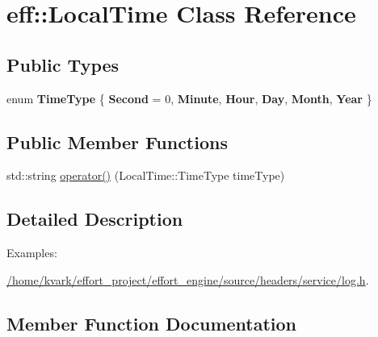 \hypertarget{classeff_1_1LocalTime}{}\section{eff\+:\+:Local\+Time Class Reference}
\label{classeff_1_1LocalTime}
\subsection*{Public Types}
\begin{DoxyCompactItemize}
\item 
\mbox{\label{classeff_1_1LocalTime_a09de312805bf8c27785ca4fab8c94767}} 
enum {\bfseries Time\+Type} \{ \newline
{\bfseries Second} = 0, 
{\bfseries Minute}, 
{\bfseries Hour}, 
{\bfseries Day}, 
\newline
{\bfseries Month}, 
{\bfseries Year}
 \}
\end{DoxyCompactItemize}
\subsection*{Public Member Functions}
\begin{DoxyCompactItemize}
\item 
std\+::string \mbox{\hyperlink{classeff_1_1LocalTime_a602662475583a2d6490a13edb2e5e1cc}{operator()}} (Local\+Time\+::\+Time\+Type time\+Type)
\end{DoxyCompactItemize}


\subsection{Detailed Description}
\begin{Desc}
\item[Examples\+: ]\par
\mbox{\hyperlink{_2home_2kvark_2effort_project_2effort_engine_2source_2headers_2service_2log_8h-example}{/home/kvark/effort\+\_\+project/effort\+\_\+engine/source/headers/service/log.\+h}}.\end{Desc}


\subsection{Member Function Documentation}
\mbox{\label{classeff_1_1LocalTime_a602662475583a2d6490a13edb2e5e1cc}} 
